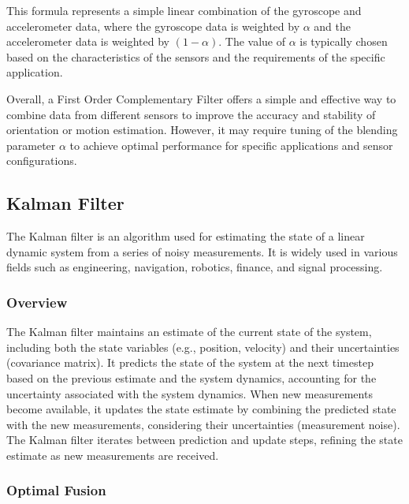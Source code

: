 \documentclass[conference]{IEEEtran}
\begin{document}

This formula represents a simple linear combination of the gyroscope and accelerometer data, where the gyroscope data is weighted by \( \alpha \) and the accelerometer data is weighted by \( (1 - \alpha) \). The value of \( \alpha \) is typically chosen based on the characteristics of the sensors and the requirements of the specific application.

Overall, a First Order Complementary Filter offers a simple and effective way to combine data from different sensors to improve the accuracy and stability of orientation or motion estimation. However, it may require tuning of the blending parameter $\alpha$ to achieve optimal performance for specific applications and sensor configurations.

\subsection{Kalman Filter}

The Kalman filter is an algorithm used for estimating the state of a linear dynamic system from a series of noisy measurements. It is widely used in various fields such as engineering, navigation, robotics, finance, and signal processing.\\

\subsubsection{Overview}

The Kalman filter maintains an estimate of the current state of the system, including both the state variables (e.g., position, velocity) and their uncertainties (covariance matrix). It predicts the state of the system at the next timestep based on the previous estimate and the system dynamics, accounting for the uncertainty associated with the system dynamics. When new measurements become available, it updates the state estimate by combining the predicted state with the new measurements, considering their uncertainties (measurement noise). The Kalman filter iterates between prediction and update steps, refining the state estimate as new measurements are received.\\

\subsubsection{Optimal Fusion}
\end{document}
